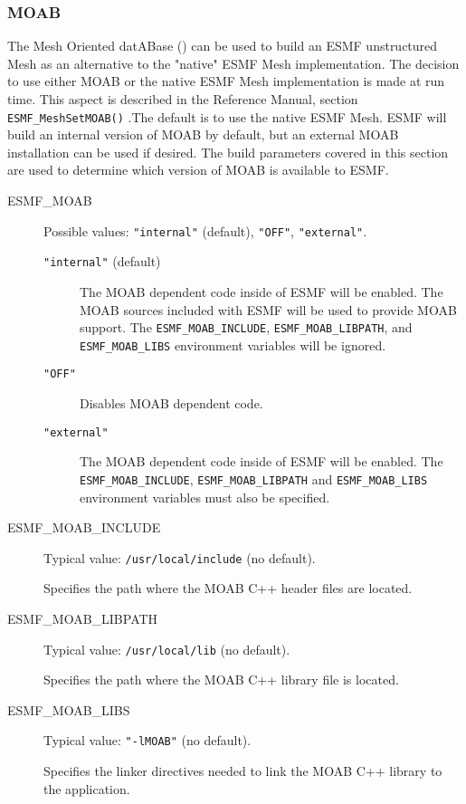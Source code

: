 \subsubsection{MOAB}
\label{sec:MOAB}

The Mesh Oriented datABase
()
can be used to build an ESMF unstructured Mesh as an alternative to the 
"native" ESMF Mesh implementation. The decision to use either MOAB or the 
native ESMF Mesh implementation is made at run time. This aspect is described 
in the Reference Manual, section {\tt ESMF\_MeshSetMOAB()} .The default is to use 
the native ESMF Mesh. ESMF will build an internal version of MOAB by default, 
but an external MOAB installation can be used if desired. The build parameters 
covered in this section are used to determine which version of MOAB is 
available to ESMF. 

\begin{description}

\item[ESMF\_MOAB] Possible values: {\tt "internal"} (default), {\tt "OFF"},
{\tt "external"}.

\begin{description}
\item[{\tt "internal"} (default)] The MOAB dependent code inside of ESMF will
be enabled.
The MOAB sources included with ESMF will be used to provide MOAB support.
The {\tt ESMF\_MOAB\_INCLUDE}, {\tt ESMF\_MOAB\_LIBPATH}, and
{\tt ESMF\_MOAB\_LIBS} environment variables will be ignored.

\item[{\tt "OFF"}] Disables MOAB dependent code.

\item[{\tt "external"}] The MOAB dependent code inside of ESMF will
be enabled.
The {\tt ESMF\_MOAB\_INCLUDE}, {\tt ESMF\_MOAB\_LIBPATH} and 
{\tt ESMF\_MOAB\_LIBS} environment variables must also be specified.
\end{description}

\item[ESMF\_MOAB\_INCLUDE] Typical value: {\tt /usr/local/include}
(no default).

Specifies the path where the MOAB C++ header files are located.

\item[ESMF\_MOAB\_LIBPATH] Typical value: {\tt /usr/local/lib} (no default).

Specifies the path where the MOAB C++ library file is located.

\item[ESMF\_MOAB\_LIBS] Typical value: {\tt "-lMOAB"} (no default).

Specifies the linker directives needed to link the MOAB C++ library to
the application.

\end{description}


